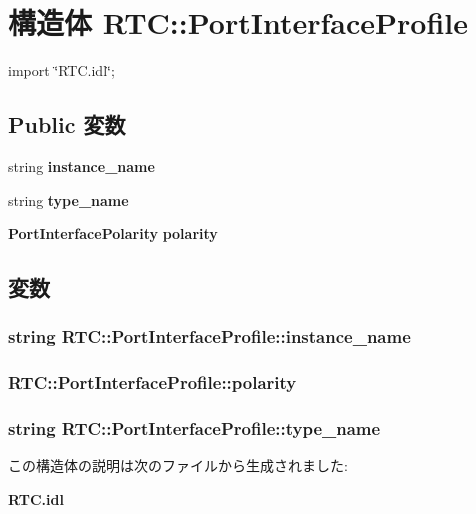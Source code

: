 \section{構造体 RTC::PortInterfaceProfile}
\label{structRTC_1_1PortInterfaceProfile}


{\ttfamily import \char`\"{}RTC.idl\char`\"{};}

\subsection*{Public 変数}
\begin{DoxyCompactItemize}
\item 
string {\bf instance\_\-name}
\item 
string {\bf type\_\-name}
\item 
{\bf PortInterfacePolarity} {\bf polarity}
\end{DoxyCompactItemize}


\subsection{変数}
\subsubsection[{instance\_\-name}]{\setlength{\rightskip}{0pt plus 5cm}string {\bf RTC::PortInterfaceProfile::instance\_\-name}}\label{structRTC_1_1PortInterfaceProfile_a725784d1451e8f16269c57b571aa0ed6}
\subsubsection[{polarity}]{ {\bf RTC::PortInterfaceProfile::polarity}}\label{structRTC_1_1PortInterfaceProfile_a65e7b1f54dc9334341257609cc70a9b6}
\subsubsection[{type\_\-name}]{\setlength{\rightskip}{0pt plus 5cm}string {\bf RTC::PortInterfaceProfile::type\_\-name}}\label{structRTC_1_1PortInterfaceProfile_ad5ffa44cfad5a86628ddeea5a294d801}


この構造体の説明は次のファイルから生成されました:\begin{DoxyCompactItemize}
\item 
{\bf RTC.idl}\end{DoxyCompactItemize}
